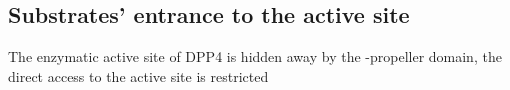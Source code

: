 \subsection{Substrates' entrance to the active site}

The enzymatic active site of DPP4 is hidden away by the \beta-propeller domain, the direct access to the active site is restricted